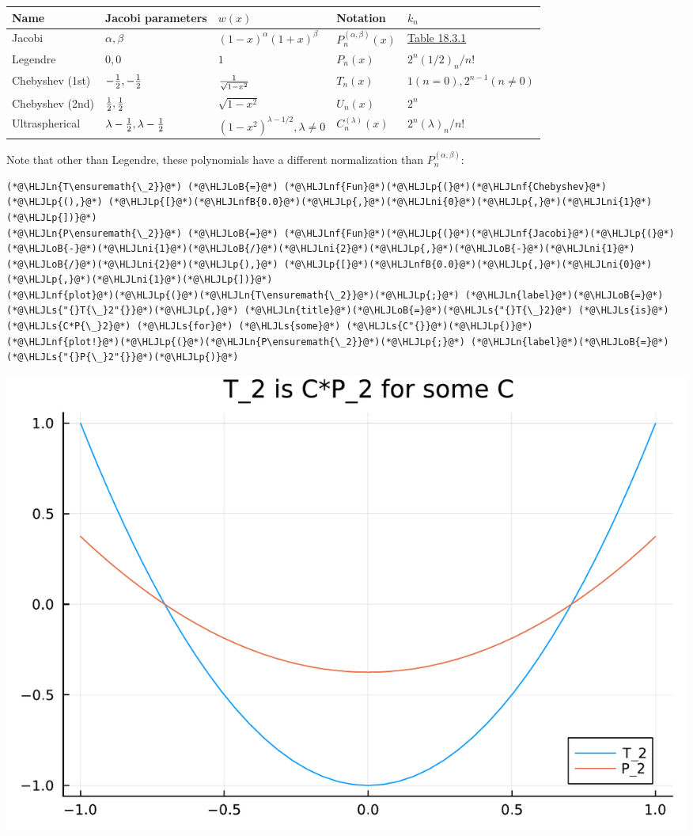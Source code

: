 \documentclass[12pt,a4paper]{article}
\newcommand{\HLJLn}[1]{#1}
\newcommand{\HLJLnf}[1]{\textcolor[RGB]{66,102,213}{#1}}
\newcommand{\HLJLs}[1]{\textcolor[RGB]{201,61,57}{#1}}
\newcommand{\HLJLnfB}[1]{\textcolor[RGB]{59,151,46}{#1}}
\newcommand{\HLJLni}[1]{\textcolor[RGB]{59,151,46}{#1}}
\newcommand{\HLJLoB}[1]{\textcolor[RGB]{102,102,102}{\textbf{#1}}}
\newcommand{\HLJLp}[1]{#1}
\begin{document}
\begin{tabular}
{l | l | l | l | l}
Name & Jacobi parameters & $w(x)$ & Notation & $k_n$ \\
\hline
Jacobi & $\alpha,\beta$ & $(1-x)^{\alpha} (1+x)^\beta$ & $P_n^{(\alpha,\beta)}(x)$ & \href{http://dlmf.nist.gov/18.3}{Table 18.3.1} \\
Legendre & $0,0$ & $1$ & $P_n(x)$ & $2^n(1/2)_n/n!$ \\
Chebyshev (1st) & $-{1 \over 2},-{1 \over 2}$ & $1 \over \sqrt{1-x^2}$ & $T_n(x)$ & $1 (n=0), 2^{n-1} (n \neq 0)$ \\
Chebyshev (2nd) & ${1 \over 2},{1 \over 2}$ & $\sqrt{1-x^2}$ & $U_n(x)$ & $2^n$ \\
Ultraspherical & $\lambda-{1 \over 2},\lambda-{1 \over 2}$ & $(1-x^2)^{\lambda - 1/2}, \lambda \neq 0$ & $C_n^{(\lambda)}(x)$ & $2^n(\lambda)_n/n!$ \\
\end{tabular}
Note that other than Legendre, these polynomials have a different normalization than $P_n^{(\alpha,\beta)}$:


\begin{lstlisting}
(*@\HLJLn{T\ensuremath{\_2}}@*) (*@\HLJLoB{=}@*) (*@\HLJLnf{Fun}@*)(*@\HLJLp{(}@*)(*@\HLJLnf{Chebyshev}@*)(*@\HLJLp{(),}@*) (*@\HLJLp{[}@*)(*@\HLJLnfB{0.0}@*)(*@\HLJLp{,}@*)(*@\HLJLni{0}@*)(*@\HLJLp{,}@*)(*@\HLJLni{1}@*)(*@\HLJLp{])}@*)
(*@\HLJLn{P\ensuremath{\_2}}@*) (*@\HLJLoB{=}@*) (*@\HLJLnf{Fun}@*)(*@\HLJLp{(}@*)(*@\HLJLnf{Jacobi}@*)(*@\HLJLp{(}@*)(*@\HLJLoB{-}@*)(*@\HLJLni{1}@*)(*@\HLJLoB{/}@*)(*@\HLJLni{2}@*)(*@\HLJLp{,}@*)(*@\HLJLoB{-}@*)(*@\HLJLni{1}@*)(*@\HLJLoB{/}@*)(*@\HLJLni{2}@*)(*@\HLJLp{),}@*) (*@\HLJLp{[}@*)(*@\HLJLnfB{0.0}@*)(*@\HLJLp{,}@*)(*@\HLJLni{0}@*)(*@\HLJLp{,}@*)(*@\HLJLni{1}@*)(*@\HLJLp{])}@*)
(*@\HLJLnf{plot}@*)(*@\HLJLp{(}@*)(*@\HLJLn{T\ensuremath{\_2}}@*)(*@\HLJLp{;}@*) (*@\HLJLn{label}@*)(*@\HLJLoB{=}@*)(*@\HLJLs{"{}T{\_}2"{}}@*)(*@\HLJLp{,}@*) (*@\HLJLn{title}@*)(*@\HLJLoB{=}@*)(*@\HLJLs{"{}T{\_}2}@*) (*@\HLJLs{is}@*) (*@\HLJLs{C*P{\_}2}@*) (*@\HLJLs{for}@*) (*@\HLJLs{some}@*) (*@\HLJLs{C"{}}@*)(*@\HLJLp{)}@*)
(*@\HLJLnf{plot!}@*)(*@\HLJLp{(}@*)(*@\HLJLn{P\ensuremath{\_2}}@*)(*@\HLJLp{;}@*) (*@\HLJLn{label}@*)(*@\HLJLoB{=}@*)(*@\HLJLs{"{}P{\_}2"{}}@*)(*@\HLJLp{)}@*)
\end{lstlisting}

\includegraphics[width=\linewidth]{jl_hpkPoK/OP_methods_test_14_1.pdf}
\end{document}

